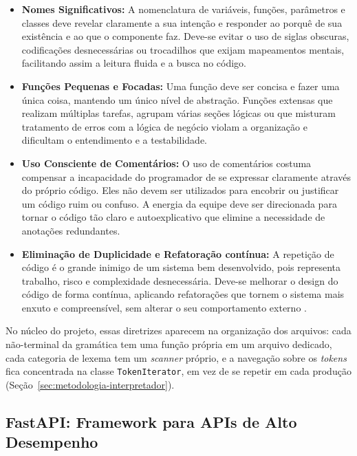 \begin{itemize}
    \item \textbf{Nomes Significativos:} A nomenclatura de variáveis, funções, parâmetros e classes deve revelar claramente a sua intenção e responder ao porquê de sua existência e ao que o componente faz. Deve-se evitar o uso de siglas obscuras, codificações desnecessárias ou trocadilhos que exijam mapeamentos mentais, facilitando assim a leitura fluida e a busca no código.

    \item \textbf{Funções Pequenas e Focadas:} Uma função deve ser concisa e fazer uma única coisa, mantendo um único nível de abstração. Funções extensas que realizam múltiplas tarefas, agrupam várias seções lógicas ou que misturam tratamento de erros com a lógica de negócio violam a organização e dificultam o entendimento e a testabilidade.

    \item \textbf{Uso Consciente de Comentários:} O uso de comentários costuma compensar a incapacidade do programador de se expressar claramente através do próprio código. Eles não devem ser utilizados para encobrir ou justificar um código ruim ou confuso. A energia da equipe deve ser direcionada para tornar o código tão claro e autoexplicativo que elimine a necessidade de anotações redundantes.

    \item \textbf{Eliminação de Duplicidade e Refatoração contínua:} A repetição de código é o grande inimigo de um sistema bem desenvolvido, pois representa trabalho, risco e complexidade desnecessária. Deve-se melhorar o design do código de forma contínua, aplicando refatorações que tornem o sistema mais enxuto e compreensível, sem alterar o seu comportamento externo \cite{martin_clean_code}.
\end{itemize}

No núcleo do projeto, essas diretrizes aparecem na organização dos arquivos: cada não-terminal da gramática tem uma função própria em um arquivo dedicado, cada categoria de lexema tem um \textit{scanner} próprio, e a navegação sobre os \textit{tokens} fica concentrada na classe \texttt{TokenIterator}, em vez de se repetir em cada produção (Seção~\ref{sec:metodologia-interpretador}).

\subsection{FastAPI: Framework para APIs de Alto Desempenho}

